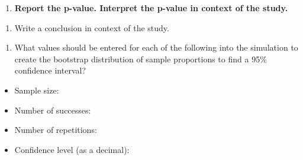 \documentclass[
]{report}
\providecommand{\tightlist}{%
  \setlength{\itemsep}{0pt}\setlength{\parskip}{0pt}}
\begin{document}
\begin{enumerate}
\def\labelenumi{\arabic{enumi}.}
\setcounter{enumi}{7}
\tightlist
\item
  \textbf{Report the p-value. Interpret the p-value in context of the study.}
\end{enumerate}

\vspace{1in}

\begin{enumerate}
\def\labelenumi{\arabic{enumi}.}
\setcounter{enumi}{8}
\tightlist
\item
  Write a conclusion in context of the study.
\end{enumerate}

\vspace{1in}

\begin{enumerate}
\def\labelenumi{\arabic{enumi}.}
\setcounter{enumi}{9}
\tightlist
\item
  What values should be entered for each of the following into the simulation to create the bootstrap distribution of sample proportions to find a 95\% confidence interval?
  \vspace{1mm}
\end{enumerate}

\begin{itemize}
\tightlist
\item
  Sample size:
\end{itemize}

\vspace{.1in}

\begin{itemize}
\tightlist
\item
  Number of successes:
\end{itemize}

\vspace{.1in}

\begin{itemize}
\tightlist
\item
  Number of repetitions:
\end{itemize}

\vspace{.1in}

\begin{itemize}
\tightlist
\item
  Confidence level (as a decimal):
\end{itemize}

\vspace{.1in}
\end{document}
